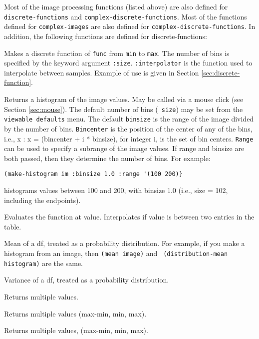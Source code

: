 Most of the image processing functions (listed above) are also defined
for {\tt discrete-functions} and {\tt complex-discrete-functions}.
Most of the functions defined for {\tt complex-images} are also
defined for {\tt complex-discrete-functions}.  In addition, the
following functions are defined for discrete-functions:
\begin{description}
\item{}
Makes a discrete function of {\tt func} from {\tt min} to {\tt max}.
The number of bins is specified by the keyword argument {\tt :size}.
{\tt :interpolator} is the function used to interpolate between
samples.  Example of use is given in Section
\ref{sec:discrete-function}.

\item{}
Returns a histogram of the image values.  May be called via a mouse
click (see Section \ref{sec:mouse}).  The default number of bins ({\tt
size}) may be set from the {\tt viewable defaults} menu.  The default
{\tt binsize} is the range of the image divided by the number of bins.
{\tt Bincenter} is the position of the center of any of the bins,
i.e., {x : x = (bincenter + i * binsize)}, for integer i, is the set
of bin centers.  {\tt Range} can be used to specify a subrange of the
image values.  If range and binsize are both passed, then they
determine the number of bins.  For example:
\begin{verbatim}
(make-histogram im :binsize 1.0 :range '(100 200)}
\end{verbatim}
histograms values between 100 and 200, with binsize 1.0 (i.e., size =
102, including the endpoints).

\item{}
Evaluates the function at value.  Interpolates if value is between two
entries in the table.

\item{}
Mean of a df, treated as a probability distribution.  For example, if
you make a histogram from an image, then {\tt (mean image)} and {\tt
(distribution-mean histogram)} are the same.

\item{}
Variance of a df, treated as a probability distribution.

\item{}
Returns multiple values.

\item{}
Returns multiple values (max-min, min, max).

\item{}
Returns multiple values, (max-min, min, max).

\item{}
\end{description}



